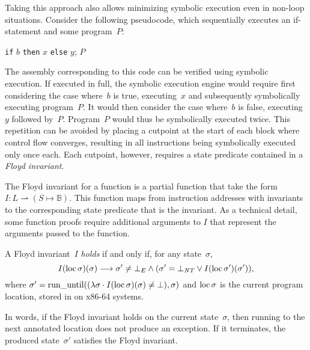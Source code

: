Taking this approach also allows minimizing symbolic execution
even in non-loop situations.
Consider the following pseudocode,
which sequentially executes an if-statement and some program~$P$:
\begin{flushleft}
  \texttt{if} $b$ \texttt{then} $x$ \texttt{else} $y$; $P$
\end{flushleft}
The assembly corresponding to this code can be verified using symbolic execution.
If executed in full, the symbolic execution engine
would require first considering the case where~$b$ is true,
executing~$x$ and subsequently symbolically executing program~$P$.
It would then consider the case where~$b$ is false, executing~$y$ followed by~$P$.
Program~$P$ would thus be symbolically executed twice.
This repetition can be avoided
by placing a cutpoint at the start of each block where control flow converges,
resulting in all instructions being symbolically executed only once each.
Each cutpoint, however, requires a state predicate contained
in a \emph{Floyd invariant}.

The Floyd invariant for a function is a partial function
that take the form $I:L\rightharpoonup(S\mapsto\mathbb{B})$.%
%
This function maps from instruction addresses with invariants
to the corresponding state predicate that is the invariant.
As a technical detail, some function proofs require additional arguments to $I$
that represent the arguments passed to the function.
\begin{definition}
  A Floyd invariant~$I$ \emph{holds} if and only if, for any state~$\sigma$,
  \begin{equation}
    I(\operatorname{loc}\sigma)(\sigma)\longrightarrow
    \sigma'\neq\bot_E\wedge(\sigma'=\bot_{\mathit{NT}}\vee I(\operatorname{loc}\sigma')(\sigma')),
  \end{equation}%
  where
  $\sigma'=\operatorname{run\_until}((\lambda\sigma\cdot I(\operatorname{loc}\sigma)(\sigma)\neq\bot),\sigma)$%
  and $\operatorname{loc}\sigma$ is the current program location,
  stored in  on x86-64 systems.
\end{definition}
In words, if the Floyd invariant holds on the current state~$\sigma$,
then running to the next annotated location does not produce an exception.
If it terminates, the produced state~$\sigma'$ satisfies the Floyd invariant.

